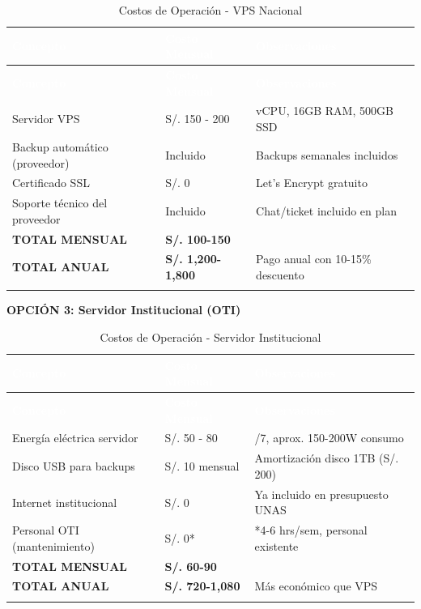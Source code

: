 \documentclass[12pt,a4paper]{article}
\begin{document}
\begin{longtable}{|>{\raggedright\arraybackslash}p{5cm}|>{\centering\arraybackslash}p{3cm}|>{\raggedright\arraybackslash}p{6cm}|}
\hline
\rowcolor{headercolor}
\textcolor{white}{\textbf{Concepto}} & \textcolor{white}{\textbf{Costo Mensual}} & \textcolor{white}{\textbf{Observaciones}} \\
\hline
\endfirsthead
\hline
\rowcolor{headercolor}
\textcolor{white}{\textbf{Concepto}} & \textcolor{white}{\textbf{Costo Mensual}} & \textcolor{white}{\textbf{Observaciones}} \\
\hline
\endhead
\hline
\endlastfoot

Servidor VPS & S/. 150 - 200 & 4 vCPU, 16GB RAM, 500GB SSD \\
\hline
\rowcolor{rowgray}
Backup automático (proveedor) & Incluido & Backups semanales incluidos \\
\hline
Certificado SSL & S/. 0 & Let's Encrypt gratuito \\
\hline
\rowcolor{rowgray}
Soporte técnico del proveedor & Incluido & Chat/ticket incluido en plan \\
\hline
\textbf{TOTAL MENSUAL} & \textbf{S/. 100-150} & \\
\hline
\textbf{TOTAL ANUAL} & \textbf{S/. 1,200-1,800} & Pago anual con 10-15\% descuento \\
\hline
\caption{Costos de Operación - VPS Nacional}
\end{longtable}

\textbf{OPCIÓN 3: Servidor Institucional (OTI)}

\begin{longtable}{|>{\raggedright\arraybackslash}p{5cm}|>{\centering\arraybackslash}p{3cm}|>{\raggedright\arraybackslash}p{6cm}|}
\hline
\rowcolor{headercolor}
\textcolor{white}{\textbf{Concepto}} & \textcolor{white}{\textbf{Costo Mensual}} & \textcolor{white}{\textbf{Observaciones}} \\
\hline
\endfirsthead
\hline
\rowcolor{headercolor}
\textcolor{white}{\textbf{Concepto}} & \textcolor{white}{\textbf{Costo Mensual}} & \textcolor{white}{\textbf{Observaciones}} \\
\hline
\endhead
\hline
\endlastfoot

Energía eléctrica servidor & S/. 50 - 80 & 24/7, aprox. 150-200W consumo \\
\hline
\rowcolor{rowgray}
Disco USB para backups & S/. 10 mensual & Amortización disco 1TB (S/. 200) \\
\hline
Internet institucional & S/. 0 & Ya incluido en presupuesto UNAS \\
\hline
\rowcolor{rowgray}
Personal OTI (mantenimiento) & S/. 0* & *4-6 hrs/sem, personal existente \\
\hline
\textbf{TOTAL MENSUAL} & \textbf{S/. 60-90} & \\
\hline
\textbf{TOTAL ANUAL} & \textbf{S/. 720-1,080} & Más económico que VPS \\
\hline
\caption{Costos de Operación - Servidor Institucional}
\end{longtable}
\end{document}

